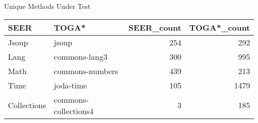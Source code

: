 \begin{table*******}
\centering
\caption{Unique Methods Under Test}
\label{tab:common_unique_MUT}
\begin{tabular}{llrr}
\toprule
        SEER &                 TOGA* &  SEER\_count &  TOGA*\_count \\
\midrule
       Jsoup &                 jsoup &         254 &          292 \\
        Lang &         commons-lang3 &         300 &          995 \\
        Math &       commons-numbers &         439 &          213 \\
        Time &             joda-time &         105 &         1479 \\
 Collections &  commons-collections4 &           3 &          185 \\
\bottomrule
\end{tabular}
\end{table*******}
